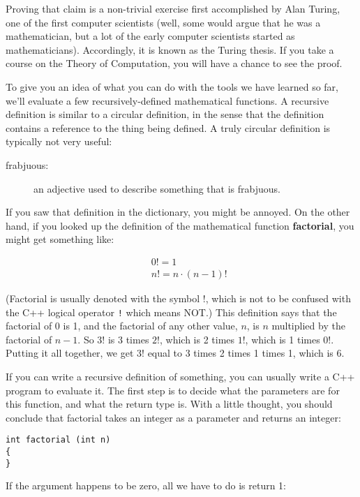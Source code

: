 
Proving that claim is a non-trivial exercise first
accomplished by Alan Turing, one of the first computer scientists
(well, some would argue that he was a mathematician, but a lot of the
early computer scientists started as mathematicians).  Accordingly, it
is known as the Turing thesis.  If you take a course on the Theory of
Computation, you will have a chance to see the proof.

To give you an idea of what you can do with the tools we have learned
so far, we'll evaluate a few recursively-defined
mathematical functions.  A recursive definition is similar to a
circular definition, in the sense that the definition contains a
reference to the thing being defined.  A truly circular definition is
typically not very useful:

\begin{description}

\item[frabjuous:] an adjective used to describe
something that is frabjuous.


\end{description}

If you saw that definition in the dictionary, you might be
annoyed.  On the other hand, if you looked up the definition
of the mathematical function {\bf factorial}, you might
get something like:

\begin{eqnarray*}
&&  0! = 1 \\
&&  n! = n \cdot (n-1)!
\end{eqnarray*}

(Factorial is usually denoted with the symbol $!$, which is
not to be confused with the C++ logical operator {\tt !} which
means NOT.)  This definition says that the factorial of 0 is 1,
and the factorial of any other value, $n$, is $n$ multiplied
by the factorial of $n-1$.  So $3!$ is 3 times $2!$, which is 2 times
$1!$, which is 1 times 0!.  Putting it all together, we get
$3!$ equal to 3 times 2 times 1 times 1, which is 6.

If you can write a recursive definition of something, you can usually
write a C++ program to evaluate it.  The first step is to decide what
the parameters are for this function, and what the return type is.
With a little thought, you should conclude that factorial takes an
integer as a parameter and returns an integer:

\begin{verbatim}
int factorial (int n)
{
}
\end{verbatim}
%
If the argument happens to be zero, all we have to do is
return 1:

